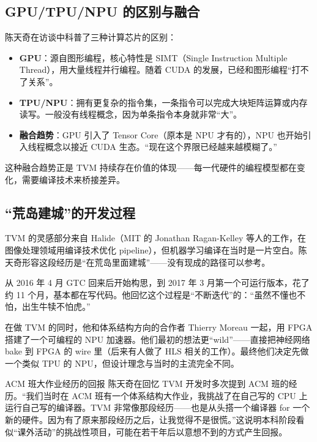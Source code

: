 \documentclass[a4paper]{article}
\begin{document}
\subsection{GPU/TPU/NPU 的区别与融合}

陈天奇在访谈中科普了三种计算芯片的区别：

\begin{itemize}
    \item \textbf{GPU}：源自图形编程，核心特性是 SIMT（Single Instruction Multiple Thread），用大量线程并行编程。随着 CUDA 的发展，已经和图形编程``打不了关系''。
    \item \textbf{TPU/NPU}：拥有更复杂的指令集，一条指令可以完成大块矩阵运算或内存读写。一般没有线程概念，因为单条指令本身就非常``大''。
    \item \textbf{融合趋势}：GPU 引入了 Tensor Core（原本是 NPU 才有的），NPU 也开始引入线程概念以接近 CUDA 生态。``现在这个界限已经越来越模糊了。''
\end{itemize}

这种融合趋势正是 TVM 持续存在价值的体现------每一代硬件的编程模型都在变化，需要编译技术来桥接差异。

\subsection{``荒岛建城''的开发过程}

TVM 的灵感部分来自 Halide（MIT 的 Jonathan Ragan-Kelley 等人的工作，在图像处理领域用编译技术优化 pipeline），但机器学习编译在当时是一片空白。陈天奇形容这段经历是``在荒岛里面建城''------没有现成的路径可以参考。

从 2016 年 4 月 GTC 回来后开始构思，到 2017 年 3 月第一个可运行版本，花了约 11 个月，基本都在写代码。他回忆这个过程是``不断迭代''的：``虽然不懂也不怕，出生牛犊不怕虎。''

在做 TVM 的同时，他和体系结构方向的合作者 Thierry Moreau 一起，用 FPGA 搭建了一个可编程的 NPU 加速器。他们最初的想法更``wild''------直接把神经网络 bake 到 FPGA 的 wire 里（后来有人做了 HLS 相关的工作）。最终他们决定先做一个类似 TPU 的 NPU，但设计理念与当时的主流完全不同。

\begin{warningbox}{ACM 班大作业经历的回报}
陈天奇在回忆 TVM 开发时多次提到 ACM 班的经历。``我们当时在 ACM 班有一个体系结构大作业，我挑战了在自己写的 CPU 上运行自己写的编译器。TVM 非常像那段经历------也是从头搭一个编译器 for 一个新的硬件。因为有了原来那段经历之后，让我觉得不是很慌。''这说明本科阶段看似``课外活动''的挑战性项目，可能在若干年后以意想不到的方式产生回报。
\end{warningbox}
\end{document}
